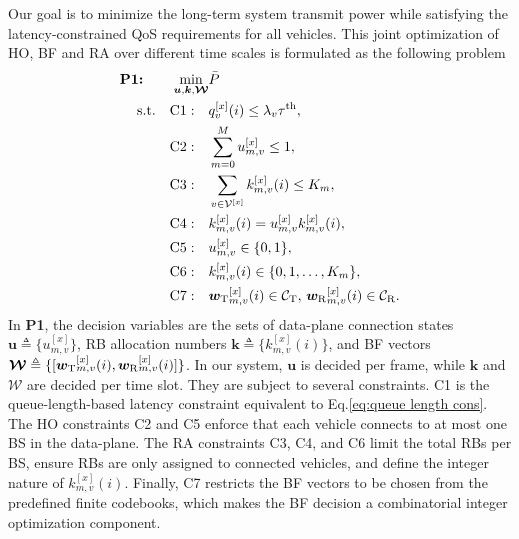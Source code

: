 \documentclass[conference, a4paper]{IEEEtran}
\theoremstyle{remark}
\begin{document}
Our goal is to minimize the long-term system transmit power while satisfying the latency-constrained QoS requirements for all vehicles. This joint optimization of HO, BF and RA over different time scales is formulated as the following problem 
\begin{equation}
    \label{prob1}
    \begin{aligned}
        \textbf{P1:} \qquad  \min_{\bm{u},\bm{k}, \bm{\mathcal{W}}} & \bar{P} \\
        \textup{s.t.} \quad 
        \textup{C1}: \quad & q_v^{[x]}(i) \leq \lambda_v \tau^{{\rm th}}, \\
        \textup{C2}: \quad & \sum_{m=0}^{M} u_{m,v}^{[x]} \leq 1, \\
        \textup{C3}: \quad & \sum_{v\in\mathcal{V}^{[x]}} k_{m,v}^{[x]}(i) \leq K_m, \\
        \textup{C4}: \quad & k_{m,v}^{[x]}(i) = u_{m,v}^{[x]}k_{m,v}^{[x]}(i), \\
        \textup{C5}: \quad & u_{m,v}^{[x]} \in \{0,1\}, \\
        \textup{C6}: \quad & k_{m,v}^{[x]}(i) \in \{0,1,\dots,K_m\}, \\
        \textup{C7}: \quad & {\bm{w}_{\rm T}}_{m,v}^{[x]}(i) \in \mathcal{C}_{\rm T}, \, {\bm{w}_{\rm R}}_{m,v}^{[x]}(i) \in \mathcal{C}_{\rm R}.
    \end{aligned}
\end{equation}
In \textbf{P1}, the decision variables are the sets of data-plane connection states $\bm{u} \triangleq \{ u_{m,v}^{[x]} \}$, RB allocation numbers $\bm{k} \triangleq \{ k_{m,v}^{[x]}(i) \}$, and BF vectors $\bm{\mathcal{W}} \triangleq \{ [{\bm{w}_{\rm T}}_{m,v}^{[x]}(i), {\bm{w}_{\rm R}}_{m,v}^{[x]}(i)] \}$. 
In our system, $\bm{u}$ is decided per frame, while $\bm{k}$ and $\bm{\mathcal{W}}$ are decided per time slot.
They are subject to several constraints. 
{C1} is the queue-length-based latency constraint equivalent to Eq.\eqref{eq:queue length cons}. 
The HO constraints {C2} and {C5} enforce that each vehicle connects to at most one BS in the data-plane. 
The RA constraints {C3}, {C4}, and {C6} limit the total RBs per BS, ensure RBs are only assigned to connected vehicles, and define the integer nature of $k_{m,v}^{[x]}(i)$. 
Finally, {C7} restricts the BF vectors to be chosen from the predefined finite codebooks, which makes the BF decision a combinatorial integer optimization component.
\end{document}

